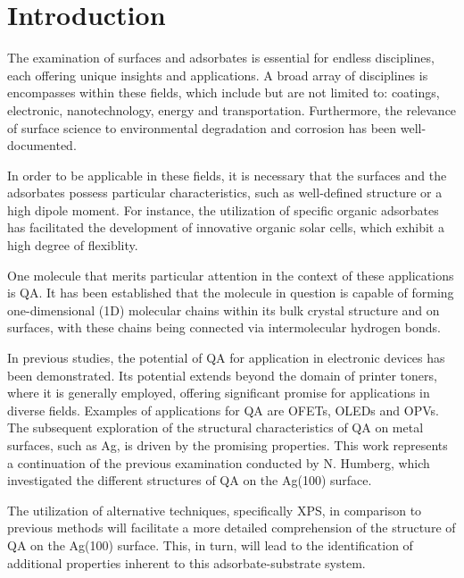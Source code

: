 \chapter{Introduction}

The examination of surfaces and adsorbates is essential for endless disciplines, each offering unique insights and applications. A broad array of disciplines is encompasses within these fields, which include but are not limited to: coatings, electronic, nanotechnology, energy and transportation.\autocite{UKResearchandInnovation2023} Furthermore, the relevance of surface science to environmental degradation and corrosion has been well-documented.\autocite{TheInternationalUnionforVacuumScienceTechniqueandApplications2023}

In order to be applicable in these fields, it is necessary that the surfaces and the adsorbates possess particular characteristics, such as well-defined structure or a high dipole moment. For instance, the utilization of specific organic adsorbates has facilitated the development of innovative organic solar cells, which exhibit a high degree of flexiblity.\autocite{Abdulrazzaq2013,Chamberlain1983,Green2010}

One molecule that merits particular attention in the context of these applications is \ac{QA}. It has been established that the molecule in question is capable of forming one-dimensional (1D) molecular chains within its bulk crystal structure\autocite{Paulus2007} and on surfaces\autocite{Wagner2014, Eberle2019, Trixler2007, Humberg2024}, with these chains being connected via intermolecular hydrogen bonds.

In previous studies, the potential of \ac{QA} for application in electronic devices has been demonstrated.\autocite{Glowacki2013,DanielGlowacki2012, Wang2016} Its potential extends beyond the domain of printer toners, where it is generally employed, offering significant promise for applications in diverse fields. Examples of applications for \ac{QA} are \acp{OFET}\autocite{Jeon2018, Jeong2017, Kanbur2019, Berg2009}, \acp{OLED}\autocite{Wang2016a, Min2021, Cunha2018} and \acp{OPV}\autocite{Dunst2017, Sung2017}.
The subsequent exploration of the structural characteristics of \ac{QA} on metal surfaces, such as \ac{Ag}, is driven by the promising properties. This work represents a continuation of the previous examination conducted by N. Humberg, which investigated the different structures of \ac{QA} on the Ag(100) surface.\autocite{Humberg2024}

The utilization of alternative techniques, specifically \ac{XPS}, in comparison to previous methods will facilitate a more detailed comprehension of the structure of \ac{QA} on the Ag(100) surface. This, in turn, will lead to the identification of additional properties inherent to this adsorbate-substrate system.

\cleardoublepage